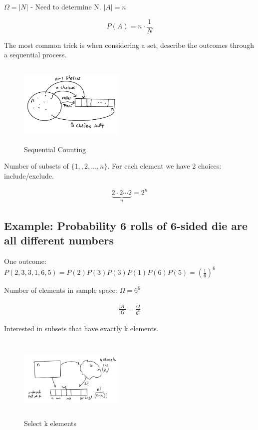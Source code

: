 \documentclass{article}
\begin{document}
$\Omega=|N|$ - Need to determine N.
$|A|=n$

$$
P(A)=n\cdot \frac{1}{N}
$$

 The most common trick is when considering a set, describe the outcomes through a sequential process.

\begin{figure}[ht]
\centering
\includegraphics[width=5cm, height=4cm]{images/L04/seq_counting.jpeg}
\caption{Sequential Counting}
\end{figure}


Number of subsets of $\{1,,2, \ldots, n\}$.  For each element we have 2 choices: include/exclude.

\begin{align*}
    \underbrace{2\cdot 2\cdots 2}_{n} = 2^n
\end{align*}

\subsection{Example: Probability 6 rolls of 6-sided die are all different numbers}


One outcome: $P(2,3,3,1,6,5)=P(2)P(3)P(3)P(1)P(6)P(5)=(\frac{1}{6})^6$

Number of elements in sample space: $\Omega=6^6$

\begin{align*}
\frac{|A|}{|\Omega|} = \frac{6!}{6^6}
\end{align*}


Interested in subsets that have exactly k elements.

\begin{figure}[ht]
\centering
\includegraphics[width=5cm, height=4cm]{images/L04/sel_k_elems.jpeg}
\caption{Select k elements}
\end{figure}
\end{document}
